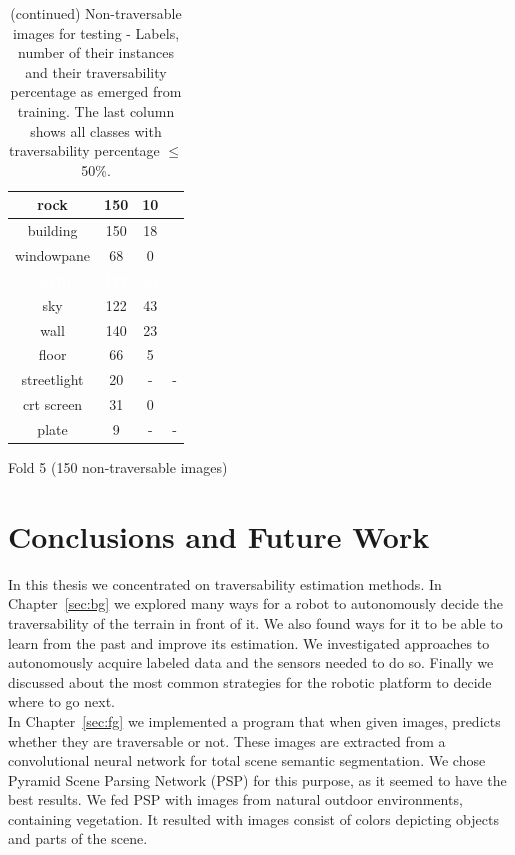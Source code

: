 \documentclass[12pt,a4paper,table,dvipsnames,tikz]{report}
\newcommand{\acronym}{\MakeUppercase}
\newcommand{\white}[1]{\textbf{\textcolor{white}{#1}}} %
\begin{document}
\begin{table}[h!]
\begin{subtable}[h!]{\textwidth}
\begin{tabular}{|c|c|c|c|}
				\hline
				rock & 150 & 10 & \checkmark\\
				\hline
				building & 150 & 18 & \checkmark\\
				\hline
				windowpane & 68 & 0 & \checkmark\\
				\hline
				\rowcolor{earth}
				\white{earth} & \white{127} & \white{43} & \white{\checkmark}\\
				\hline
				\rowcolor{sky}
				sky & 122 & 43 & \checkmark\\
				\hline
				wall & 140 & 23 & \checkmark\\
				\hline
				floor & 66 & 5 & \checkmark\\
				\hline
				streetlight & 20 & - & -\\
				\hline
				crt screen & 31 & 0 & \checkmark\\
				\hline
				plate & 9 & - & -\\
				\hline
			\end{tabular}
			\caption{Fold 5 (150 non-traversable images)}
			\label{table:obst.f5}
		\end{subtable}
		\caption{(continued) Non-traversable images for testing - Labels, number of their instances 
			and their traversability percentage as emerged from training. The last column shows all 
			classes with traversability percentage $\le$ 50\%.}
	\end{table}
	
	
	
	\chapter{Conclusions and Future Work}
	\label{sec:concl}
	
	In this thesis we concentrated on traversability estimation methods. In 
	Chapter~\ref{sec:bg} we explored many ways for a robot to autonomously decide 
	the traversability of the terrain in front of it. We also found ways for it to 
	be able to learn from the past and improve its estimation. We investigated 
	approaches to autonomously acquire labeled data and the sensors needed to do so. 
	Finally we discussed about the most common strategies for the robotic platform 
	to decide where to go next.
	\\
	
	In Chapter~\ref{sec:fg} we implemented a program that when given images, predicts 
	whether they are traversable or not. These images are extracted from a convolutional 
	neural network for total scene semantic segmentation. We chose Pyramid Scene 
	Parsing Network (\acronym{psp}) for this purpose, as it seemed to have the best 
	results. We fed \acronym{psp} with images from natural outdoor environments, 
	containing vegetation. It resulted with images consist of colors depicting objects 
	and parts of the scene.
	\\
	
\end{document}
